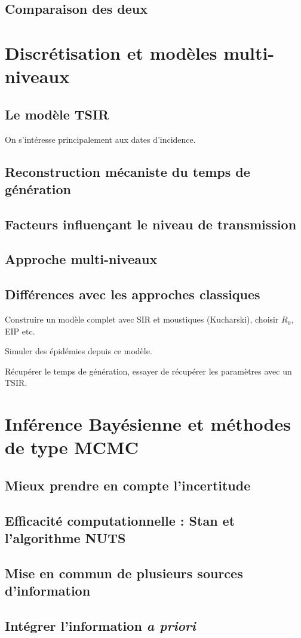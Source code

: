 \subsection{Comparaison des deux}



\section{Discrétisation et modèles multi-niveaux}

\subsection{Le modèle TSIR}

On s'intéresse principalement aux dates d'incidence.

\subsection{Reconstruction mécaniste du temps de génération}

\subsection{Facteurs influençant le niveau de transmission}

\subsection{Approche multi-niveaux}

\subsection{Différences avec les approches classiques}

Construire un modèle complet avec SIR et moustiques (Kucharski), choisir $R_0$, EIP etc.

Simuler des épidémies depuis ce modèle.

Récupérer le temps de génération, essayer de récupérer les paramètres avec un TSIR.

\section{Inférence Bayésienne et méthodes de type MCMC}
\label{sec:infbay}

\subsection{Mieux prendre en compte l'incertitude}

\subsection{Efficacité computationnelle : Stan et l'algorithme NUTS}

\subsection{Mise en commun de plusieurs sources d'information}

\subsection{Intégrer l'information {\em a priori}}



